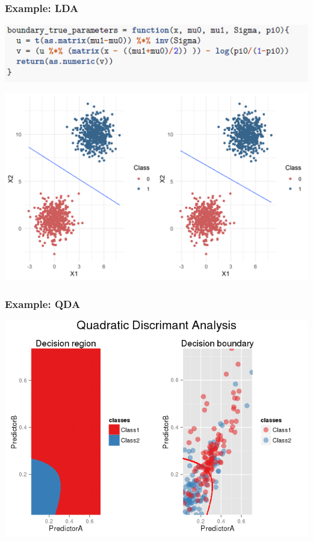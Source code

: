 \documentclass[9pt]{beamer}
\begin{document}
\begin{frame}
\frametitle{Example: LDA }
\begin{center}
\includegraphics[width=0.8\linewidth]{./boundary_lda}
\end{center}
\begin{center}
\hspace*{-.05\textwidth}\includegraphics[height=.65\textheight]{lda_plot}
\end{center}
\end{frame}


\begin{frame}
\frametitle{Example: QDA }
\begin{center}
\hspace*{-.05\textwidth}\includegraphics[height=.65\textheight]{LDA_and_QDA-2}
\end{center}
\end{frame}
\end{document}
